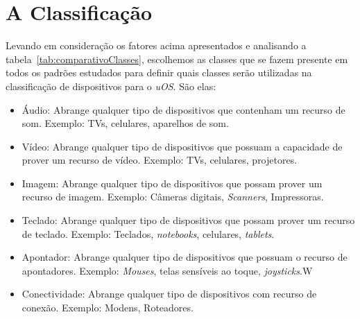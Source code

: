 \section{A Classificação}
Levando em consideração os fatores acima apresentados e analisando a tabela~\ref{tab:comparativoClasses}, escolhemos as classes que se fazem presente em todos os padrões estudados para definir quais classes serão utilizadas na classificação de dispositivos para o \emph{uOS}. São elas:

\begin{itemize}
	\item Áudio:
		Abrange qualquer tipo de dispositivos que contenham um recurso de som. Exemplo: TVs, celulares, aparelhos de som.
	\item Vídeo:
		Abrange qualquer tipo de dispositivos que possuam a capacidade de prover um recurso de vídeo. Exemplo: TVs, celulares, projetores.
	\item Imagem:
		Abrange qualquer tipo de dispositivos que possam prover um recurso de imagem. Exemplo: Câmeras digitais, \emph{Scanners}, Impressoras.
	\item Teclado:
		Abrange qualquer tipo de dispositivos que possam prover um recurso de teclado. Exemplo: Teclados, \emph{notebooks}, celulares, \emph{tablets}.
	\item Apontador:
		Abrange qualquer tipo de dispositivos que possuam o recurso de apontadores. Exemplo: \emph{Mouses}, telas sensíveis ao toque, \emph{joysticks}.W
	\item Conectividade:
		Abrange qualquer tipo de dispositivos com recurso de conexão. Exemplo: Modens, Roteadores.
\end{itemize}